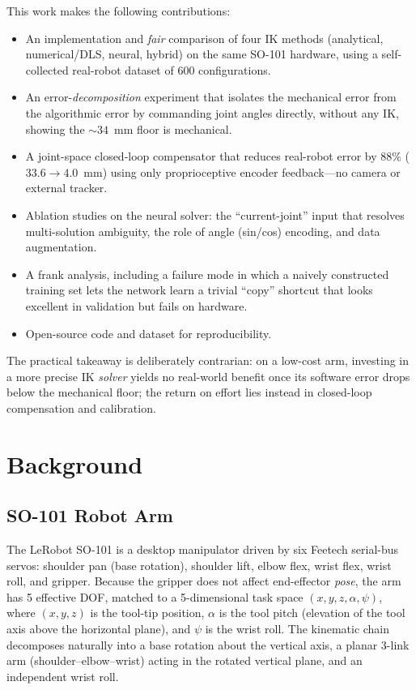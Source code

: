 \documentclass[conference]{IEEEtran}
\begin{document}
This work makes the following contributions:
\begin{itemize}
\item An implementation and \emph{fair} comparison of four IK methods (analytical, numerical/DLS, neural, hybrid) on the same SO-101 hardware, using a self-collected real-robot dataset of 600 configurations.
\item An error-\emph{decomposition} experiment that isolates the mechanical error from the algorithmic error by commanding joint angles directly, without any IK, showing the $\sim\!34$~mm floor is mechanical.
\item A joint-space closed-loop compensator that reduces real-robot error by $88\%$ ($33.6\!\to\!4.0$~mm) using only proprioceptive encoder feedback---no camera or external tracker.
\item Ablation studies on the neural solver: the ``current-joint'' input that resolves multi-solution ambiguity, the role of angle (sin/cos) encoding, and data augmentation.
\item A frank analysis, including a failure mode in which a naively constructed training set lets the network learn a trivial ``copy'' shortcut that looks excellent in validation but fails on hardware.
\item Open-source code and dataset for reproducibility.
\end{itemize}

The practical takeaway is deliberately contrarian: on a low-cost arm, investing in a more precise IK \emph{solver} yields no real-world benefit once its software error drops below the mechanical floor; the return on effort lies instead in closed-loop compensation and calibration.

\section{Background}

\subsection{SO-101 Robot Arm}

The LeRobot SO-101 is a desktop manipulator driven by six Feetech serial-bus servos: shoulder pan (base rotation), shoulder lift, elbow flex, wrist flex, wrist roll, and gripper. Because the gripper does not affect end-effector \emph{pose}, the arm has 5 effective DOF, matched to a 5-dimensional task space $(x, y, z, \alpha, \psi)$, where $(x,y,z)$ is the tool-tip position, $\alpha$ is the tool pitch (elevation of the tool axis above the horizontal plane), and $\psi$ is the wrist roll. The kinematic chain decomposes naturally into a base rotation about the vertical axis, a planar 3-link arm (shoulder--elbow--wrist) acting in the rotated vertical plane, and an independent wrist roll.
\end{document}
